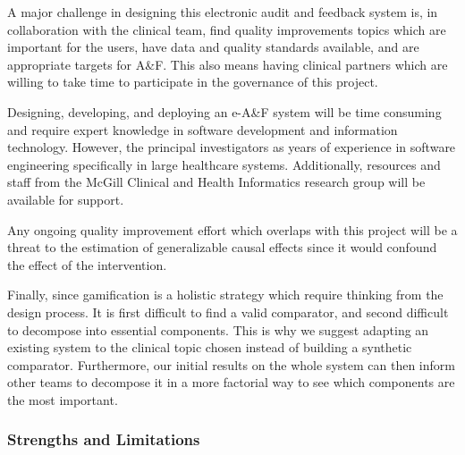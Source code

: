 A major challenge in designing this electronic audit and feedback system is, in collaboration with the clinical team, find quality improvements topics which are important for the users, have data and quality standards available, and are appropriate targets for A\&F. This also means having clinical partners which are willing to take time to participate in the governance of this project.

Designing, developing, and deploying an e-A\&F system will be time consuming and require expert knowledge in software development and information technology. However, the principal investigators as years of experience in software engineering specifically in large healthcare systems. Additionally, resources and staff from the McGill Clinical and Health Informatics research group will be available for support.

Any ongoing quality improvement effort which overlaps with this project will be a threat to the estimation of generalizable causal effects since it would confound the effect of the intervention.

Finally, since gamification is a holistic strategy which require thinking from the design process. It is first difficult to find a valid comparator, and second difficult to decompose into essential components. This is why we suggest adapting an existing system to the clinical topic chosen instead of building a synthetic comparator. Furthermore, our initial results on the whole system can then inform other teams to decompose it in a more factorial way to see which components are the most important. 

\subsubsection{Strengths and Limitations}

